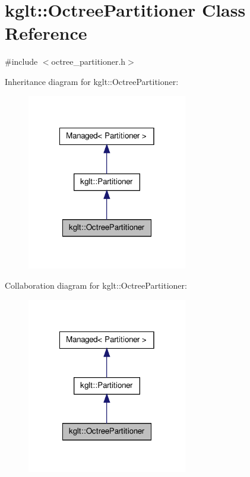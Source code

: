 \hypertarget{classkglt_1_1_octree_partitioner}{\section{kglt\-:\-:Octree\-Partitioner Class Reference}
\label{classkglt_1_1_octree_partitioner}
}


{\ttfamily \#include $<$octree\-\_\-partitioner.\-h$>$}



Inheritance diagram for kglt\-:\-:Octree\-Partitioner\-:\nopagebreak
\begin{figure}[H]
\begin{center}
\leavevmode
\includegraphics[width=198pt]{classkglt_1_1_octree_partitioner__inherit__graph}
\end{center}
\end{figure}


Collaboration diagram for kglt\-:\-:Octree\-Partitioner\-:\nopagebreak
\begin{figure}[H]
\begin{center}
\leavevmode
\includegraphics[width=198pt]{classkglt_1_1_octree_partitioner__coll__graph}
\end{center}
\end{figure}
